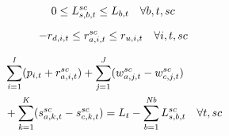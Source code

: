 \begin{equation} \label{SB_3}
0  \leq L_{s,b,t}^{sc} \leq L_{b,t} \quad \forall b,t,sc \\
\end{equation}

\vspace{-1em}

\begin{equation} \label{SB_4}
-r_{d,i,t}  \leq r_{a,i,t}^{sc} \leq r_{u,i,t} \quad \forall i,t,sc \\
\end{equation}

\vspace{-1.5em}

\begin{equation} \label{SB_5}
\begin{aligned}
& \sum_{{\it i}=1}^{{\it I}}(p_{i,t}+r_{a,i,t}^{sc})+\sum_{{\it j}=1}^{{\it J}}(w_{a,j,t}^{sc}-w_{c,j,t}^{sc}) \\
& +\sum_{{\it k}=1}^{{\it K}}(s_{a,k,t}^{sc}-s_{c,k,t}^{sc})=L_{t}-\sum_{{\it b}=1}^{{\it Nb}}L_{s,b,t}^{sc} \quad \forall t,sc
\end{aligned}
\end{equation}

\vspace{-1.5em}

